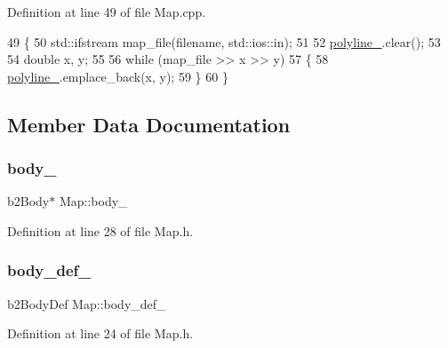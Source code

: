 Definition at line 49 of file Map.\+cpp.


\begin{DoxyCode}
49                                                 \{
50     std::ifstream map\_file(filename, std::ios::in);
51 
52     \hyperlink{classMap_a6bb2e5bde1854c9ceb4ad7d0349aa878}{polyline\_}.clear();
53 
54     \textcolor{keywordtype}{double} x, y;
55 
56     \textcolor{keywordflow}{while} (map\_file >> x >> y)
57     \{
58         \hyperlink{classMap_a6bb2e5bde1854c9ceb4ad7d0349aa878}{polyline\_}.emplace\_back(x, y);
59     \}
60 \}
\end{DoxyCode}


\subsection{Member Data Documentation}
\mbox{\label{classMap_a195872fd7eb8c84db43a75bf27a6a2f2}} 
\subsubsection{\texorpdfstring{body\+\_\+}{body\_}}
{\footnotesize\ttfamily b2\+Body$\ast$ Map\+::body\+\_\+\hspace{0.3cm}{\ttfamily [private]}}



Definition at line 28 of file Map.\+h.

\mbox{\label{classMap_a1913e9e11e4e52ef5b71c31a41badfe9}} 
\subsubsection{\texorpdfstring{body\+\_\+def\+\_\+}{body\_def\_}}
{\footnotesize\ttfamily b2\+Body\+Def Map\+::body\+\_\+def\+\_\+\hspace{0.3cm}{\ttfamily [private]}}



Definition at line 24 of file Map.\+h.

\mbox{\label{classMap_a011ca799401c6fa3fa115ee223412a8c}} 
